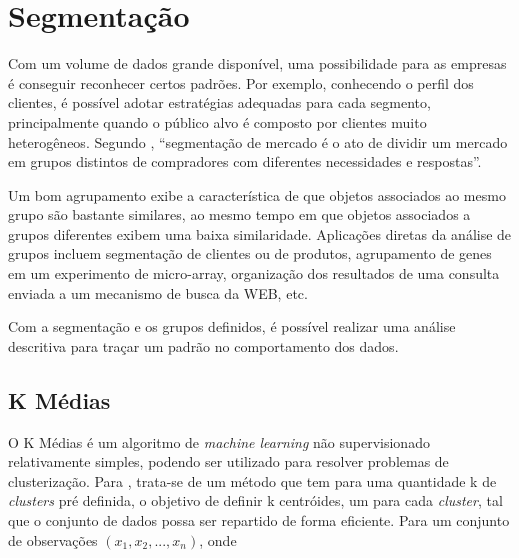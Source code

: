 \section{Segmentação}


Com um volume de dados grande disponível, uma possibilidade para as empresas é conseguir reconhecer certos padrões. Por exemplo, conhecendo o perfil dos clientes, é possível adotar estratégias adequadas para cada segmento, principalmente quando o público alvo é composto por clientes muito heterogêneos. Segundo , ``segmentação de mercado é o ato de dividir um mercado em grupos distintos de compradores com diferentes necessidades e respostas''.

\begin{citacao} 
Um bom agrupamento exibe a característica de que objetos associados ao mesmo grupo são bastante similares, ao mesmo tempo em que objetos associados a grupos diferentes exibem uma baixa similaridade. Aplicações diretas da análise de grupos incluem segmentação de clientes ou de produtos, agrupamento de genes em um experimento de micro-array, organização dos resultados de uma consulta enviada a um mecanismo de busca da WEB, etc.
\cite{BEZERRA} \end{citacao}

Com a segmentação e os grupos definidos, é possível realizar uma análise descritiva para traçar um padrão no comportamento dos dados. 

\subsection{K Médias}

O K Médias é um algoritmo de \emph{machine learning} não supervisionado relativamente simples, podendo ser utilizado para resolver problemas de clusterização. Para , trata-se de um método que tem para uma quantidade k de \emph{clusters} pré definida, o objetivo de definir k centróides\footnotemark {}, um para cada \emph{cluster}, tal que o conjunto de dados possa ser repartido de forma eficiente. Para um conjunto de observações \begin{math}(x_{1}, x_{2}, ..., x_{n})\end{math}, onde 

